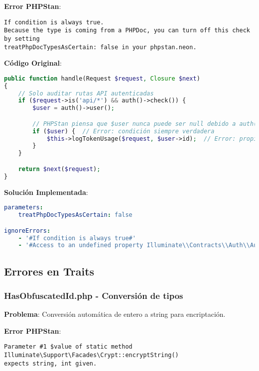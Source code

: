 \documentclass[12pt,a4paper]{article}
\begin{document}
\textbf{Error PHPStan}:
\begin{lstlisting}[caption=Error en AuditTokenUsage.php]
If condition is always true.
Because the type is coming from a PHPDoc, you can turn off this check by setting
treatPhpDocTypesAsCertain: false in your phpstan.neon.
\end{lstlisting}

\textbf{Código Original}:
\begin{lstlisting}[language=php, caption=AuditTokenUsage.php - Condicional problemático]
public function handle(Request $request, Closure $next)
{
    // Solo auditar rutas API autenticadas
    if ($request->is('api/*') && auth()->check()) {
        $user = auth()->user();

        // PHPStan piensa que $user nunca puede ser null debido a auth()->check()
        if ($user) {  // Error: condición siempre verdadera
            $this->logTokenUsage($request, $user->id);  // Error: propiedad no detectada
        }
    }

    return $next($request);
}
\end{lstlisting}

\textbf{Solución Implementada}:
\begin{lstlisting}[language=yaml, caption=Configuración para condicionales]
parameters:
    treatPhpDocTypesAsCertain: false

ignoreErrors:
    - '#If condition is always true#'
    - '#Access to an undefined property Illuminate\\Contracts\\Auth\\Authenticatable::\$id#'
\end{lstlisting}

\subsection{Errores en Traits}

\subsubsection{HasObfuscatedId.php - Conversión de tipos}

\textbf{Problema}: Conversión automática de entero a string para encriptación.

\textbf{Error PHPStan}:
\begin{lstlisting}[caption=Error en trait HasObfuscatedId]
Parameter #1 $value of static method Illuminate\Support\Facades\Crypt::encryptString()
expects string, int given.
\end{lstlisting}
\end{document}
